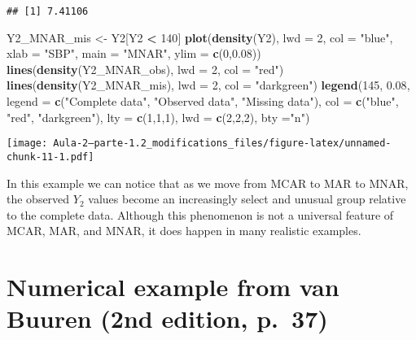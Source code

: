 \documentclass[
]{article}
\newenvironment{Shaded}{\begin{snugshade}}{\end{snugshade}}
\newcommand{\AttributeTok}[1]{\textcolor[rgb]{0.13,0.29,0.53}{#1}}
\newcommand{\DecValTok}[1]{\textcolor[rgb]{0.00,0.00,0.81}{#1}}
\newcommand{\FloatTok}[1]{\textcolor[rgb]{0.00,0.00,0.81}{#1}}
\newcommand{\FunctionTok}[1]{\textcolor[rgb]{0.13,0.29,0.53}{\textbf{#1}}}
\newcommand{\NormalTok}[1]{#1}
\newcommand{\OtherTok}[1]{\textcolor[rgb]{0.56,0.35,0.01}{#1}}
\newcommand{\SpecialCharTok}[1]{\textcolor[rgb]{0.81,0.36,0.00}{\textbf{#1}}}
\newcommand{\StringTok}[1]{\textcolor[rgb]{0.31,0.60,0.02}{#1}}
\begin{document}
\begin{verbatim}
## [1] 7.41106
\end{verbatim}

\begin{Shaded}
\begin{Highlighting}[]
\NormalTok{Y2\_MNAR\_mis }\OtherTok{\textless{}{-}}\NormalTok{ Y2[Y2 }\SpecialCharTok{\textless{}} \DecValTok{140}\NormalTok{] }
\FunctionTok{plot}\NormalTok{(}\FunctionTok{density}\NormalTok{(Y2), }\AttributeTok{lwd =} \DecValTok{2}\NormalTok{, }\AttributeTok{col =} \StringTok{"blue"}\NormalTok{, }\AttributeTok{xlab =} \StringTok{"SBP"}\NormalTok{, }\AttributeTok{main =} \StringTok{"MNAR"}\NormalTok{, }\AttributeTok{ylim =} \FunctionTok{c}\NormalTok{(}\DecValTok{0}\NormalTok{,}\FloatTok{0.08}\NormalTok{))}
\FunctionTok{lines}\NormalTok{(}\FunctionTok{density}\NormalTok{(Y2\_MNAR\_obs), }\AttributeTok{lwd =} \DecValTok{2}\NormalTok{, }\AttributeTok{col =} \StringTok{"red"}\NormalTok{)}
\FunctionTok{lines}\NormalTok{(}\FunctionTok{density}\NormalTok{(Y2\_MNAR\_mis), }\AttributeTok{lwd =} \DecValTok{2}\NormalTok{, }\AttributeTok{col =} \StringTok{"darkgreen"}\NormalTok{)}
\FunctionTok{legend}\NormalTok{(}\DecValTok{145}\NormalTok{, }\FloatTok{0.08}\NormalTok{, }\AttributeTok{legend =} \FunctionTok{c}\NormalTok{(}\StringTok{"Complete data"}\NormalTok{, }\StringTok{"Observed data"}\NormalTok{, }\StringTok{"Missing data"}\NormalTok{), }
       \AttributeTok{col =} \FunctionTok{c}\NormalTok{(}\StringTok{"blue"}\NormalTok{, }\StringTok{"red"}\NormalTok{, }\StringTok{"darkgreen"}\NormalTok{), }\AttributeTok{lty =} \FunctionTok{c}\NormalTok{(}\DecValTok{1}\NormalTok{,}\DecValTok{1}\NormalTok{,}\DecValTok{1}\NormalTok{), }\AttributeTok{lwd =} \FunctionTok{c}\NormalTok{(}\DecValTok{2}\NormalTok{,}\DecValTok{2}\NormalTok{,}\DecValTok{2}\NormalTok{), }\AttributeTok{bty =}\StringTok{"n"}\NormalTok{)}
\end{Highlighting}
\end{Shaded}

\texttt{[image: Aula-2---parte-1.2\_modifications\_files/figure-latex/unnamed-chunk-11-1.pdf]}

In this example we can notice that as we move from MCAR to MAR to MNAR,
the observed \(Y_2\) values become an increasingly select and unusual
group relative to the complete data. Although this phenomenon is not a
universal feature of MCAR, MAR, and MNAR, it does happen in many
realistic examples.

\hypertarget{numerical-example-from-van-buuren-2nd-edition-p.-37}{%
\section{Numerical example from van Buuren (2nd edition,
p.~37)}\label{numerical-example-from-van-buuren-2nd-edition-p.-37}}
\end{document}
